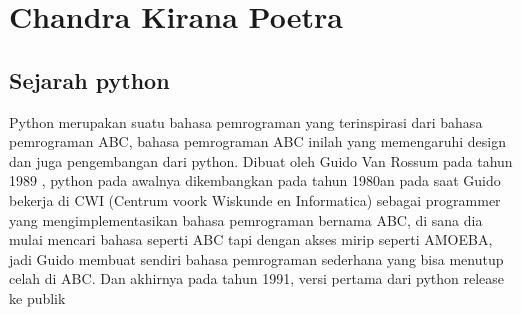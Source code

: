 \section{Chandra Kirana Poetra}



 
 
\subsection{Sejarah python}

\begin{flushleft}
\qquad Python merupakan suatu bahasa pemrograman yang terinspirasi dari bahasa pemrograman ABC, bahasa pemrograman ABC inilah yang memengaruhi design dan juga pengembangan dari python. Dibuat oleh Guido Van Rossum pada tahun 1989 , python pada awalnya dikembangkan pada tahun 1980an pada saat Guido bekerja di CWI (Centrum voork Wiskunde en Informatica) sebagai programmer yang mengimplementasikan bahasa pemrograman bernama ABC, di sana dia mulai mencari bahasa seperti ABC tapi dengan akses mirip seperti AMOEBA, jadi Guido membuat sendiri bahasa pemrograman sederhana yang bisa menutup celah di ABC. Dan akhirnya pada tahun 1991, versi pertama dari python release ke publik
\end{flushleft}

